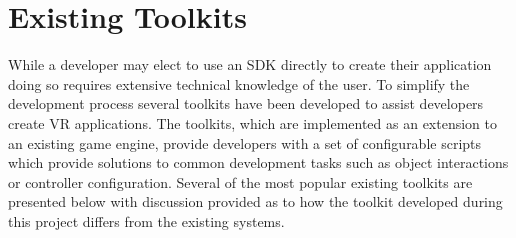 \documentclass{l4proj}
\begin{document}
\section{Existing Toolkits}
\label{sec:contextexistingtoolkits}
While a developer may elect to use an SDK directly to create their application doing so requires extensive technical knowledge of the user. To simplify the development process several toolkits have been developed to assist developers create VR applications. The toolkits, which are implemented as an extension to an existing game engine, provide developers with a set of configurable scripts which provide solutions to common development tasks such as object interactions or controller configuration. Several of the most popular existing toolkits are presented below with discussion provided as to how the toolkit developed during this project differs from the existing systems.
\end{document}
